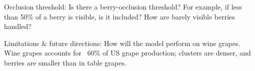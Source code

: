 \documentclass{ar2rc}
\begin{document}



\begin{reviewercomment}
    Occlusion  threshold: Is there a berry-occlusion threshold? For example, if less  than 50\% of a berry is visible, is it included? How are barely visible  berries handled?
\end{reviewercomment}




\begin{reviewercomment}
    Limitations \& future directions: How will the  model perform on wine grapes. Wine grapes accounts for ~60\% of US grape  production; clusters are denser, and berries are smaller than in table grapes.
\end{reviewercomment}





\phantom{\cite{}} %

\renewcommand{\bibsection}{} %

\end{document}
